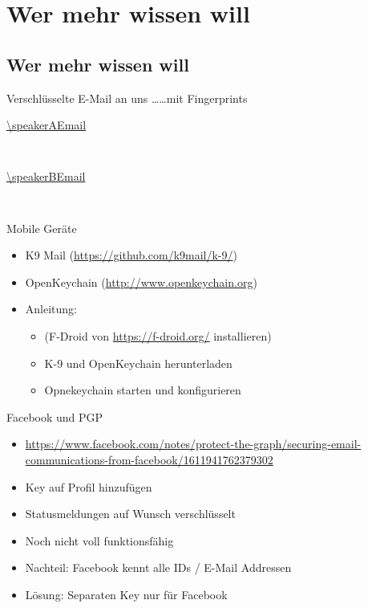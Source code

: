 \section{Wer mehr wissen will}
\subsection*{Wer mehr wissen will}

\blackframe


\begin{frame}{Verschlüsselte E-Mail an uns \dots}{\dots mit Fingerprints}
	\begin{block}{\url{\speakerAEmail}}
		\begin{center}
			\tt
			\larger
			\speakerAFP
		\end{center}
	\end{block}
	\begin{block}{\url{\speakerBEmail}}
		\begin{center}
			\tt
			\larger
			\speakerBFP
		\end{center}
	\end{block}
\end{frame}

\blackframe

\begin{frame}{Mobile Geräte}
	\begin{itemize}
		\item K9 Mail (\url{https://github.com/k9mail/k-9/})
		\item OpenKeychain (\url{http://www.openkeychain.org})
		\item Anleitung: 
			\begin{itemize}
				\item (F-Droid von \url{https://f-droid.org/} installieren)
				\item K-9 und OpenKeychain herunterladen
				\item Opnekeychain starten und konfigurieren
			\end{itemize}
	\end{itemize}
\end{frame}

\begin{frame}{Facebook und PGP}
	\begin{itemize}
		\item \url{https://www.facebook.com/notes/protect-the-graph/securing-email-communications-from-facebook/1611941762379302}
		\item Key auf Profil hinzufügen
		\item Statusmeldungen auf Wunsch verschlüsselt
		\item Noch nicht voll funktionsfähig
		\item Nachteil: Facebook kennt alle IDs / E-Mail Addressen
		\item Lösung: Separaten Key nur für Facebook
	\end{itemize}
\end{frame}

